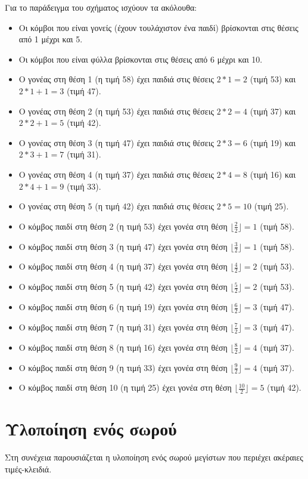 Για το παράδειγμα του σχήματος ισχύουν τα ακόλουθα:
\begin{itemize}
\item Οι κόμβοι που είναι γονείς (έχουν τουλάχιστον ένα παιδί) βρίσκονται στις θέσεις από 1 μέχρι και 5.
\item Οι κόμβοι που είναι φύλλα βρίσκονται στις θέσεις από 6 μέχρι και 10.
\item Ο γονέας στη θέση 1 (η τιμή 58) έχει παιδιά στις θέσεις $2*1=2$ (τιμή 53) και $2*1+1=3$ (τιμή 47).
\item Ο γονέας στη θέση 2 (η τιμή 53) έχει παιδιά στις θέσεις $2*2=4$ (τιμή 37) και $2*2+1=5$ (τιμή 42).
\item Ο γονέας στη θέση 3 (η τιμή 47) έχει παιδιά στις θέσεις $2*3=6$ (τιμή 19) και $2*3+1=7$ (τιμή 31).
\item Ο γονέας στη θέση 4 (η τιμή 37) έχει παιδιά στις θέσεις $2*4=8$ (τιμή 16) και $2*4+1=9$ (τιμή 33).
\item Ο γονέας στη θέση 5 (η τιμή 42) έχει παιδιά στις θέσεις $2*5=10$ (τιμή 25).
\item Ο κόμβος παιδί στη θέση 2 (η τιμή 53) έχει γονέα στη θέση $\lfloor{\frac{2}{2}}\rfloor=1$ (τιμή 58).
\item Ο κόμβος παιδί στη θέση 3 (η τιμή 47) έχει γονέα στη θέση $\lfloor{\frac{3}{2}}\rfloor=1$ (τιμή 58).
\item Ο κόμβος παιδί στη θέση 4 (η τιμή 37) έχει γονέα στη θέση $\lfloor{\frac{4}{2}}\rfloor=2$ (τιμή 53).
\item Ο κόμβος παιδί στη θέση 5 (η τιμή 42) έχει γονέα στη θέση $\lfloor{\frac{5}{2}}\rfloor=2$ (τιμή 53).
\item Ο κόμβος παιδί στη θέση 6 (η τιμή 19) έχει γονέα στη θέση $\lfloor{\frac{6}{2}}\rfloor=3$ (τιμή 47).
\item Ο κόμβος παιδί στη θέση 7 (η τιμή 31) έχει γονέα στη θέση $\lfloor{\frac{7}{2}}\rfloor=3$ (τιμή 47).
\item Ο κόμβος παιδί στη θέση 8 (η τιμή 16) έχει γονέα στη θέση $\lfloor{\frac{8}{2}}\rfloor=4$ (τιμή 37).
\item Ο κόμβος παιδί στη θέση 9 (η τιμή 33) έχει γονέα στη θέση $\lfloor{\frac{9}{2}}\rfloor=4$ (τιμή 37).
\item Ο κόμβος παιδί στη θέση 10 (η τιμή 25) έχει γονέα στη θέση $\lfloor{\frac{10}{2}}\rfloor=5$ (τιμή 42).
\end{itemize}

\section{Υλοποίηση ενός σωρού}
Στη συνέχεια παρουσιάζεται η υλοποίηση ενός σωρού μεγίστων που περιέχει ακέραιες τιμές-κλειδιά.


